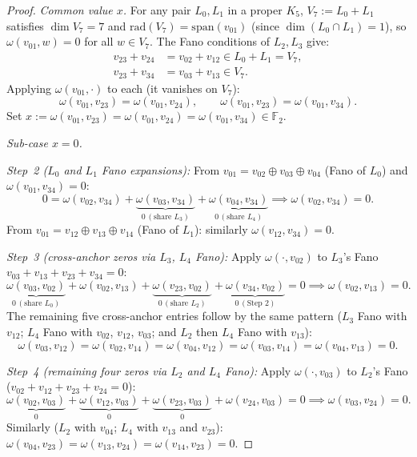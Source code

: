 \documentclass[11pt,a4paper]{article}
\theoremstyle{remark}
\begin{document}
\begin{proof}
\textit{Common value $x$.}
For any pair $L_0, L_1$ in a proper $K_5$,
$V_7 := L_0 + L_1$ satisfies $\dim V_7 = 7$ and
$\mathrm{rad}(V_7) = \mathrm{span}(v_{01})$
(since $\dim(L_0 \cap L_1) = 1$), so $\omega(v_{01}, w) = 0$ for all $w \in V_7$.
The Fano conditions of $L_2, L_3$ give:
\begin{align*}
  v_{23} + v_{24} &= v_{02} + v_{12} \in L_0 + L_1 = V_7, \\
  v_{23} + v_{34} &= v_{03} + v_{13} \in V_7.
\end{align*}
Applying $\omega(v_{01}, \cdot)$ to each (it vanishes on $V_7$):
\[
  \omega(v_{01},v_{23}) = \omega(v_{01},v_{24}), \qquad
  \omega(v_{01},v_{23}) = \omega(v_{01},v_{34}).
\]
Set $x := \omega(v_{01},v_{23}) = \omega(v_{01},v_{24}) = \omega(v_{01},v_{34})
\in \mathbb{F}_2$.

\medskip
\noindent\textit{Sub-case $x = 0$.}

\textit{Step~2 ($L_0$ and $L_1$ Fano expansions):}
From $v_{01} = v_{02} \oplus v_{03} \oplus v_{04}$ (Fano of $L_0$) and $\omega(v_{01},v_{34})=0$:
\[
  0 = \omega(v_{02},v_{34}) + \underbrace{\omega(v_{03},v_{34})}_{0\,(\text{share }L_3)}
  + \underbrace{\omega(v_{04},v_{34})}_{0\,(\text{share }L_4)}
  \implies \omega(v_{02},v_{34}) = 0.
\]
From $v_{01} = v_{12} \oplus v_{13} \oplus v_{14}$ (Fano of $L_1$):
similarly $\omega(v_{12},v_{34}) = 0$.

\textit{Step~3 (cross-anchor zeros via $L_3$, $L_4$ Fano):}
Apply $\omega(\cdot, v_{02})$ to $L_3$'s Fano $v_{03}+v_{13}+v_{23}+v_{34}=0$:
\[
  \underbrace{\omega(v_{03},v_{02})}_{0\,(\text{share }L_0)}
  + \omega(v_{02},v_{13})
  + \underbrace{\omega(v_{23},v_{02})}_{0\,(\text{share }L_2)}
  + \underbrace{\omega(v_{34},v_{02})}_{0\,(\text{Step~2})}
  = 0
  \implies \omega(v_{02},v_{13}) = 0.
\]
The remaining five cross-anchor entries follow by the same pattern
($L_3$ Fano with $v_{12}$; $L_4$ Fano with $v_{02}$, $v_{12}$, $v_{03}$;
and $L_2$ then $L_4$ Fano with $v_{13}$):
\[
  \omega(v_{03},v_{12})=\omega(v_{02},v_{14})=\omega(v_{04},v_{12})
  =\omega(v_{03},v_{14})=\omega(v_{04},v_{13})=0.
\]

\textit{Step~4 (remaining four zeros via $L_2$ and $L_4$ Fano):}
Apply $\omega(\cdot, v_{03})$ to $L_2$'s Fano ($v_{02}+v_{12}+v_{23}+v_{24}=0$):
\[
  \underbrace{\omega(v_{02},v_{03})}_{0} + \underbrace{\omega(v_{12},v_{03})}_{0}
  + \underbrace{\omega(v_{23},v_{03})}_{0} + \omega(v_{24},v_{03}) = 0
  \implies \omega(v_{03},v_{24}) = 0.
\]
Similarly ($L_2$ with $v_{04}$; $L_4$ with $v_{13}$ and $v_{23}$):
$\omega(v_{04},v_{23}) = \omega(v_{13},v_{24}) = \omega(v_{14},v_{23}) = 0$.


\end{proof}
\end{document}
